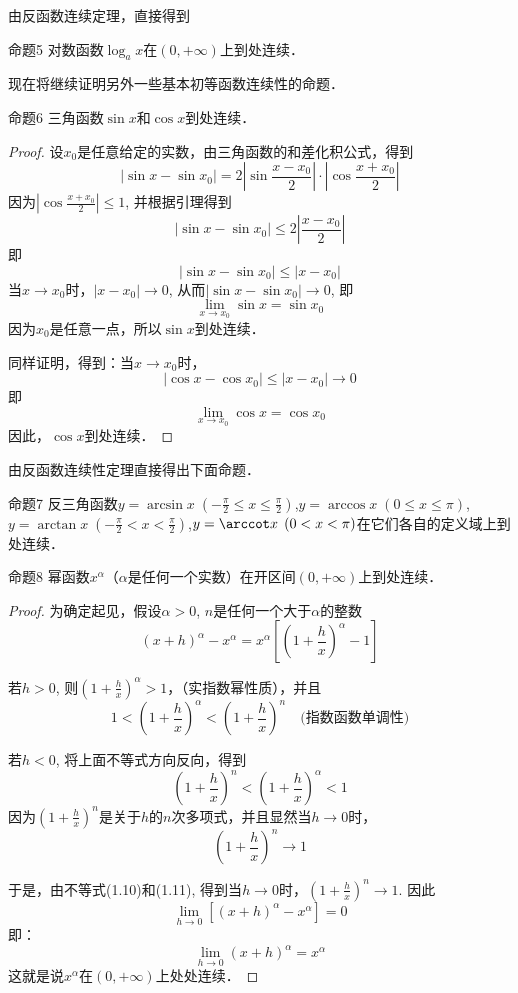 由反函数连续定理，直接得到

\begin{blk}
    {命题5} 对数函数$\log_a x$在$(0,+\infty)$上到处连续．
\end{blk}

现在将继续证明另外一些基本初等函数连续性的命题．

\begin{blk}
    {命题6} 三角函数$\sin x$和$\cos x$到处连续．
\end{blk}

\begin{proof}
设$x_0$是任意给定的实数，由三角函数的和差化积公式，得到
\[|\sin x-\sin x_0|=2\left|\sin\frac{x-x_0}{2}\right| \cdot \left|\cos \frac{x+x_0}{2}\right|\]
因为$\left|\cos\frac{x+x_0}{2}\right|\le 1$, 并根据引理得到
\[|\sin x-\sin x_0|\le 2\left|\frac{x-x_0}{2}\right|\]
即
\[|\sin x-\sin x_0|\le \left|x-x_0\right|\]
当$x\to x_0$时，$|x-x_0|\to 0$, 从而$|\sin x-\sin x_0|\to 0$, 即
\[\lim_{x\to x_0} \sin x=\sin x_0\]
因为$x_0$是任意一点，所以$\sin x$到处连续．

同样证明，得到：当$x\to x_0$时，
\[|\cos x-\cos x_0|\le |x-x_0|\to 0\]
即
\[\lim_{x\to x_0} \cos x=\cos x_0\]
因此，$\cos x$到处连续．
\end{proof}
 
由反函数连续性定理直接得出下面命题．

\begin{blk}
    {命题7} 反三角函数$y=\arcsin x\; \left(-\frac{\pi}{2}\le x\le \frac{\pi}{2}\right)$,\quad $y=\arccos x\; \left(0\le x\le \pi\right)$,\quad $y=\arctan x\; \left(-\frac{\pi}{2}< x< \frac{\pi}{2}\right)$,\quad $y=\arccot x\; \left(0<x<\pi\right)$在它们各自的定义域上到处连续．
\end{blk}

\begin{blk}{命题8}
幂函数$x^{\alpha}$（$\alpha$是任何一个实数）在开区间$(0,+\infty)$上到处连续．
\end{blk}

\begin{proof}
为确定起见，假设$\alpha>0$, $n$是任何一个大于$\alpha$的整数
\[(x+h)^{\alpha} -x^{\alpha}=x^{\alpha} \left[ \left(1+\frac{h}{x}\right)^{\alpha} -1\right] \]

若$h>0$, 则$\left(1+\frac{h}{x}\right)^{\alpha} >1$，（实指数幂性质），并且
\begin{equation}
    1<\left(1+\frac{h}{x}\right)^{\alpha}<\left(1+\frac{h}{x}\right)^{n}\quad \text{(指数函数单调性)}
\end{equation}

若$h<0$, 将上面不等式方向反向，得到
\begin{equation}
    \left(1+\frac{h}{x}\right)^{n}<\left(1+\frac{h}{x}\right)^{\alpha}<1
\end{equation}
因为$\left(1+\frac{h}{x}\right)^{n}$是关于$h$的$n$次多项式，并且显然当$h\to 0$时，
\[\left(1+\frac{h}{x}\right)^{n}\to 1\]

于是，由不等式(1.10)和(1.11), 得到当$h\to 0$时，$\left(1+\frac{h}{x}\right)^{n}\to 1$. 因此
\[\lim_{h\to 0}\left[(x+h)^{\alpha}-x^{\alpha}\right]=0\]
即：
\[\lim_{h\to 0}(x+h)^{\alpha}=x^{\alpha}\]
这就是说$x^{\alpha}$在$(0,+\infty)$上处处连续．
\end{proof}

